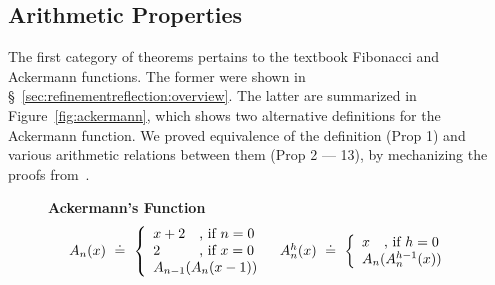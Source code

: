 \subsection{Arithmetic Properties} \label{subsec:arith} \label{subsec:ackermann}

The first category of theorems pertains to the textbook
Fibonacci and Ackermann functions.
%
The former were shown in \S~\ref{sec:refinementreflection:overview}.
%
The latter are summarized in Figure~\ref{fig:ackermann},
which shows two alternative definitions for the
Ackermann function.
%
We proved equivalence of the definition (Prop 1)
and various arithmetic relations between
them (Prop 2 --- 13), by mechanizing the
proofs from~\cite{ackermann}.

\begin{figure}[t!]
\centering
\captionsetup{justification=centering}
\textbf{Ackermann's Function}
\[
\begin{array}{lr}
\ack{n}{x} \defeq
 \left\{
\begin{array}{l}
\setlength\arraycolsep{0pt}
\begin{array}{ll}
      x+2 &\quad \text{, if}\ n=0 \\
      2   &\quad \text{, if}\ x=0 \\
\end{array} \\
\ack{n-1}{\ack{n}{x-1}}
\end{array}
\right.
&
\iack{h}{n}{x} \defeq
 \left\{
\begin{array}{l}
      x \quad \text{, if}\ h=0 \\
      \ack{n}{\iack{h-1}{n}{x}}
\end{array}
\right.
\end{array}
 \]


\end{figure}
